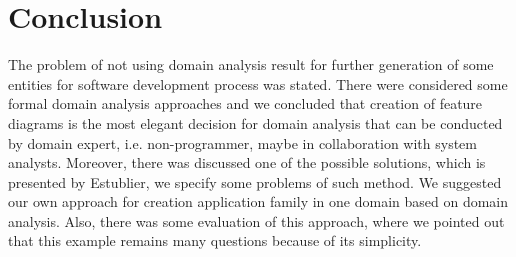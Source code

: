 \documentclass[conference]{IEEEtran}
\begin{document}
\section{Conclusion}
\label{chapter:conclusion}
The problem of not using domain analysis result for further generation of some entities for software development process was stated. There were considered some formal domain analysis approaches and we concluded that creation of feature diagrams is the most elegant decision for domain analysis that can be conducted by domain expert, i.e. non-programmer, maybe in collaboration with system analysts. Moreover, there was discussed one of the possible solutions, which is presented by Estublier, we specify some problems of such method. We suggested our own approach for creation application family in one domain based on domain analysis. Also, there was some evaluation of this approach, where we pointed out that this example remains many questions because of its simplicity.



\end{document}

